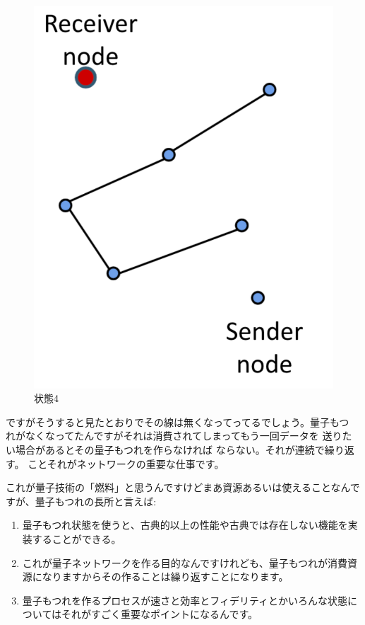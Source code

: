 \begin{figure}[H]
\begin{minipage}[b]{0.3\textwidth}
    \includegraphics[width=\textwidth]{lesson4/network_state4.pdf}
    \caption{状態4}
  \end{minipage}
\end{figure}
ですがそうすると見たとおりでその線は無くなってってるでしょう。量子もつ
れがなくなってたんですがそれは消費されてしまってもう一回データを
送りたい場合があるとその量子もつれを作らなければ
ならない。それが連続で繰り返す。
ことそれがネットワークの重要な仕事です。

これが量子技術の「燃料」と思うんですけどまあ資源あるいは使えることなんですが、量子もつれの長所と言えば:
\begin{enumerate}
    \item 量子もつれ状態を使うと、古典的以上の性能や古典では存在しない機能を実装することができる。
    \item これが量子ネットワークを作る目的なんですけれども、量子もつれが消費資源になりますからその作ることは繰り返すことになります。
    \item 量子もつれを作るプロセスが速さと効率とフィデリティとかいろんな状態についてはそれがすごく重要なポイントになるんです。
\end{enumerate}

